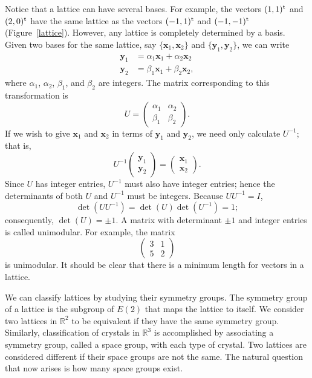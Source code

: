  
Notice that a lattice can have several bases. For example, the vectors
$(1,1)^{\rm t}$ and $(2,0)^{\rm t}$ have the  same lattice as the
vectors $(-1, 1)^{\rm t}$ and $(-1, -1)^{\rm t}$
(Figure~\ref{lattice}). However, any lattice is completely determined
by a basis. Given two bases for the same lattice, say $\{ {\mathbf x}_1,
{\mathbf x}_2 \}$ and $\{ {\mathbf y}_1, {\mathbf y}_2 \}$, we can write 
\begin{align*}
{\mathbf y}_1 & = \alpha_1  {\mathbf x}_1 + \alpha_2 {\mathbf x}_2 \\
{\mathbf y}_2 & = \beta_1  {\mathbf x}_1 + \beta_2 {\mathbf x}_2,
\end{align*}
where $\alpha_1$, $\alpha_2$, $\beta_1$, and $\beta_2$ are integers.
The matrix corresponding to this transformation is 
\[
U
=
\begin{pmatrix}
\alpha_1 & \alpha_2 \\
\beta_1 & \beta_2
\end{pmatrix}.
\]
If we wish to give ${\mathbf x}_1$ and ${\mathbf x}_2$ in terms of ${\mathbf
y}_1$ and ${\mathbf y}_2$, we need only calculate $U^{-1}$; that is, 
\[
U^{-1}
\begin{pmatrix}
{\mathbf y}_1 \\ {\mathbf y}_2
\end{pmatrix}
=
\begin{pmatrix}
{\mathbf x}_1 \\ {\mathbf x}_2
\end{pmatrix}.
\]
Since $U$ has integer entries, $U^{-1}$ must also have integer
entries; hence the determinants of both $U$ and $U^{-1}$ must be
integers. Because $U U^{-1} = I$,  
\[
\det(U U^{-1}) =\det(U) \det( U^{-1}) = 1;
\]
consequently, $\det(U) = \pm 1$. A matrix with determinant $\pm 1$ and
integer entries is called {\bfi unimodular}.
For example, the matrix 
\[
\begin{pmatrix}
3 & 1 \\
5 & 2
\end{pmatrix}
\]
is unimodular. It should be clear that there is a minimum length for
vectors in a lattice.  
 
 
We can classify lattices by studying their symmetry groups. The
symmetry group of a lattice is the subgroup of $E(2)$ that maps the
lattice to itself. We consider two lattices in ${\mathbb R}^2$ to be
equivalent if they have the same symmetry group.  Similarly,
classification of crystals in ${\mathbb R}^3$ is accomplished by
associating a symmetry group, called a {\bfi space group}, with each
type of crystal. Two lattices are considered
different if their space groups are not the same.  The natural
question that now arises is how many space groups exist. 
 
